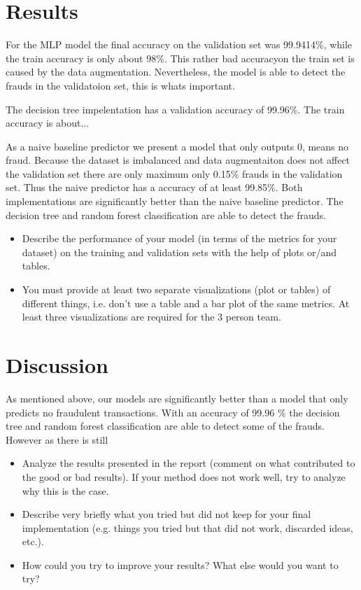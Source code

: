 \documentclass[a4paper, 10pt, conference]{ieeeconf}      %
\begin{document}
\section{Results}
\label{sec:results}
For the MLP model the final accuracy on the validation set was 99.9414\%, while the train accuracy is only about 98\%. 
This rather bad accuracyon the train set is caused by the data augmentation. Nevertheless, the model is able to detect the frauds in the validatoion set, this is whats important. 



The decision tree impelentation has a validation accuracy of 99.96\%. The train accuracy is about... %

As a naive baseline predictor we present a model that only outputs 0, means no fraud. 
Because the dataset is imbalanced and data augmentaiton does not affect the validation set there are only maximum only 0.15\% frauds in the validation set. 
Thus the naive predictor has a accuracy of at least 99.85\%. 
Both implementations are significantly better than the naive baseline predictor. The decision tree and random forest classification are able to detect the frauds. 



{\color{blue}

\begin{itemize}
	\item Describe the performance of your model (in terms of the metrics for your dataset) on the training and validation sets with the help of plots or/and tables.
	\item You must provide at least two separate visualizations
          (plot or tables) of different things, i.e. don’t use a table
          and a bar plot of the same metrics. At least three
           visualizations are required for the 3 person team.
\end{itemize}
}

\section{Discussion}
\label{sec:discuss}
As mentioned above, our models are significantly better than a model that only predicts no fraudulent transactions.
With an accuracy of 99.96 \% the decision tree and random forest classification are able to detect some of the frauds. 
However as there is still  

{\color{blue}
\begin{itemize}
	\item Analyze the results presented in the report (comment on what contributed to the good or bad results). If your method does not work well, try to analyze why this is the case.
	\item Describe very briefly what you tried but did not keep for your final implementation (e.g. things you tried but that did not work, discarded ideas, etc.).
	\item How could you try to improve your results? What else would you want to try?

\end{itemize}
}
\end{document}
